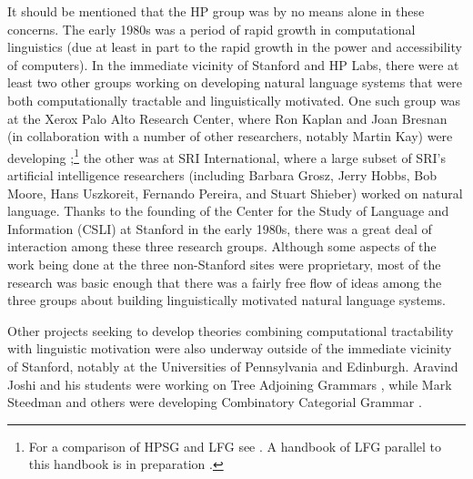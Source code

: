 \documentclass[output=paper
 	        ,biblatex
                ,babelshorthands
                ,newtxmath
                ,draftmode
                ,colorlinks, citecolor=brown
]{langscibook}
\begin{document}
It should be mentioned that the HP group was by no means alone in these concerns.  The early 1980s
was a period of rapid growth in computational linguistics (due at least in part to the rapid growth
in the power and accessibility of computers).  In the immediate vicinity of Stanford and HP Labs,
there were at least two other groups working on developing natural language systems that were both
computationally tractable and linguistically motivated.  One such group was at the Xerox Palo Alto
Research Center, where Ron Kaplan and Joan Bresnan (in
collaboration with a number of other researchers, notably Martin Kay) were
developing ;\footnote{For a comparison of HPSG and LFG see
  . A handbook of LFG parallel to this handbook is in preparation
  \citep{LFGhandbook}.}  the other was at SRI International, where a large subset of SRI's
artificial intelligence researchers  (including Barbara Grosz, Jerry
Hobbs, Bob Moore, Hans Uszkoreit, Fernando Pereira, and Stuart Shieber) worked on natural language.  Thanks to the founding of the Center for the Study of
Language and Information (CSLI) at Stanford in the early 1980s, there was a great deal of
interaction among these three research groups.  Although some aspects of the work being done at the
three non-Stanford sites were proprietary, most of the research was basic enough that there was a
fairly free flow of ideas among the three groups about building linguistically motivated natural
language systems. 

Other projects seeking to develop theories combining computational tractability with linguistic motivation were also underway outside of the immediate vicinity of Stanford, notably at the Universities of Pennsylvania and Edinburgh.  Aravind Joshi and his students were working on Tree Adjoining Grammars \citep*{JLT75a-u,Joshi87a-u}, while Mark Steedman and others were developing Combinatory Categorial Grammar \citep{Steedman87a-u,Steedman90a-u}.
\end{document}
